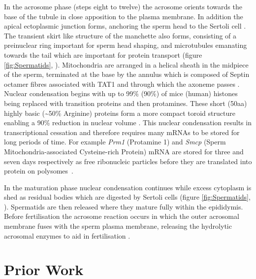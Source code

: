 In the acrosome phase (steps eight to twelve) the acrosome orients towards the base of the tubule in close apposition to the plasma membrane. In addition the apical ectoplasmic junction forms, anchoring the sperm head to the Sertoli cell \parencite{Wong2008Biology}. The transient skirt like structure of the manchette also forms, consisting of a preinuclear ring important for sperm head shaping, and microtubules emanating towards the tail which are important for protein transport (figure \ref{fig:Spermatids}, \cite{Lehti2016Formation}). Mitochondria are arranged in a helical sheath in the midpiece of the sperm, terminated at the base by the annulus which is composed of Septin octamer fibres associated with TAT1 and through which the axoneme passes \parencite{Ho2007Three, Toure2011Septins, Kuo2015SEPT12}. Nuclear condensation begins with up to 99\% (90\%) of mice (human) histones being replaced with transition proteins and then protamines. These short (50aa) highly basic (\textasciitilde50\% Arginine) proteins form a more compact toroid structure enabling a 90\% reduction in nuclear volume \parencite{Balhorn2007protamine, Ward2010Function, Yamaguchi2018Reevaluating}. This nuclear condensation results in transcriptional cessation and therefore requires many mRNAs to be stored for long periods of time. For example \textit{Prm1} (Protamine 1) and \textit{Smcp} (Sperm Mitochondria-associated Cysteine-rich Protein) mRNA are stored for three and seven days respectively as free ribonucleic particles before they are translated into protein on polysomes~\parencite{Cullinane2015Mechanisms, Kleene1984Translational, Kleene2004Patterns}.

In the maturation phase nuclear condensation continues while excess cytoplasm is shed as residual bodies which are digested by Sertoli cells (figure \ref{fig:Spermatids}, \cite{Lacy1962CERTAIN, Breucker1985Morphogenesis, Hermo2010Surfing}). Spermatids are then released where they mature fully within the epididymis. Before fertilisation the acrosome reaction occurs in which the outer acrosomal membrane fuses with the sperm plasma membrane, releasing the hydrolytic acrosomal enzymes to aid in fertilisation \parencite{Jin2011Most}.






\section{Prior Work}

